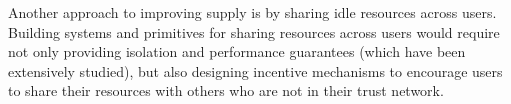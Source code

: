 Another approach to improving supply is by sharing idle resources across users. Building systems and primitives for sharing resources across users would require not only providing isolation and performance guarantees (which have been extensively studied), but also designing incentive mechanisms to encourage users to share their resources with others who are not in their trust network.




